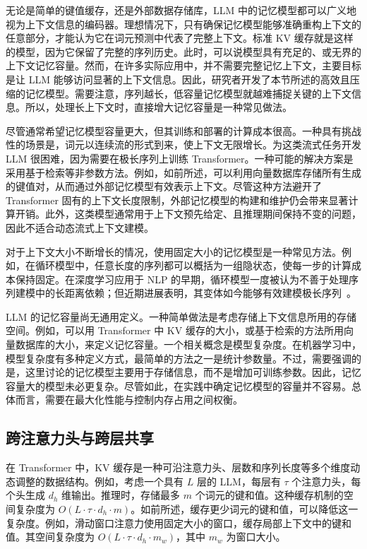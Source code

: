 \noindent 无论是简单的键值缓存，还是外部数据存储库，LLM 中的记忆模型都可以广义地视为上下文信息的编码器。理想情况下，只有确保记忆模型能够准确重构上下文的任意部分，才能认为它在词元预测中代表了完整上下文。标准 KV 缓存就是这样的模型，因为它保留了完整的序列历史。此时，可以说模型具有充足的、或无界的上下文记忆容量。然而，在许多实际应用中，并不需要完整记忆上下文，主要目标是让 LLM 能够访问显著的上下文信息。因此，研究者开发了本节所述的高效且压缩的记忆模型。需要注意，序列越长，低容量记忆模型就越难捕捉关键的上下文信息。所以，处理长上下文时，直接增大记忆容量是一种常见做法。

尽管通常希望记忆模型容量更大，但其训练和部署的计算成本很高。一种具有挑战性的场景是，词元以连续流的形式到来，使上下文无限增长。为这类流式任务开发 LLM 很困难，因为需要在极长序列上训练 Transformer。一种可能的解决方案是采用基于检索等非参数方法。例如，如前所述，可以利用向量数据库存储所有生成的键值对，从而通过外部记忆模型有效表示上下文。尽管这种方法避开了 Transformer 固有的上下文长度限制，外部记忆模型的构建和维护仍会带来显著计算开销。此外，这类模型通常用于上下文预先给定、且推理期间保持不变的问题，因此不适合动态流式上下文建模。

对于上下文大小不断增长的情况，使用固定大小的记忆模型是一种常见方法。例如，在循环模型中，任意长度的序列都可以概括为一组隐状态，使每一步的计算成本保持固定。在深度学习应用于 NLP 的早期，循环模型一度被认为不善于处理序列建模中的长距离依赖；但近期进展表明，其变体如今能够有效建模极长序列~\cite{bulatov-etal:2022recurrent,hutchins-etal:2022block,munkhdalai-etal:2024leave,ma-etal:2024megalodon}。

LLM 的记忆容量尚无通用定义。一种简单做法是考虑存储上下文信息所用的存储空间。例如，可以用 Transformer 中 KV 缓存的大小，或基于检索的方法所用向量数据库的大小，来定义记忆容量。一个相关概念是模型复杂度。在机器学习中，模型复杂度有多种定义方式，最简单的方法之一是统计参数量。不过，需要强调的是，这里讨论的记忆模型主要用于存储信息，而不是增加可训练参数。因此，记忆容量大的模型未必更复杂。尽管如此，在实践中确定记忆模型的容量并不容易。总体而言，需要在最大化性能与控制内存占用之间权衡。

\subsection{跨注意力头与跨层共享}

\noindent 在 Transformer 中，KV 缓存是一种可沿注意力头、层数和序列长度等多个维度动态调整的数据结构。例如，考虑一个具有 $L$ 层的 LLM，每层有 $\tau$ 个注意力头，每个头生成 $d_h$ 维输出。推理时，存储最多 $m$ 个词元的键和值。这种缓存机制的空间复杂度为 $O(L \cdot \tau \cdot d_h \cdot m)$。如前所述，缓存更少词元的键和值，可以降低这一复杂度。例如，滑动窗口注意力使用固定大小的窗口，缓存局部上下文中的键和值。其空间复杂度为 $O(L \cdot \tau \cdot d_h \cdot m_w)$，其中 $m_w$ 为窗口大小。

